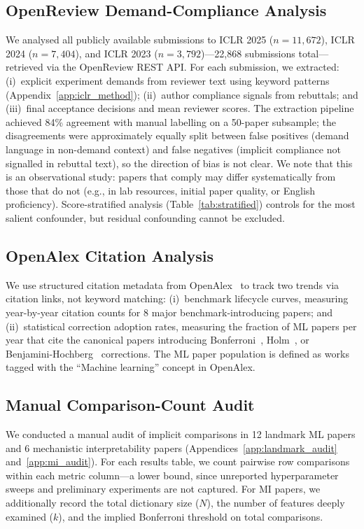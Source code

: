 \documentclass{article}
\begin{document}
\subsection{OpenReview Demand-Compliance Analysis}

We analysed all publicly available submissions to ICLR 2025 ($n = 11{,}672$), ICLR 2024 ($n = 7{,}404$), and ICLR 2023 ($n = 3{,}792$)---22,868 submissions total---retrieved via the OpenReview REST API. For each submission, we extracted: (i)~explicit experiment demands from reviewer text using keyword patterns (Appendix~\ref{app:iclr_method}); (ii)~author compliance signals from rebuttals; and (iii)~final acceptance decisions and mean reviewer scores. The extraction pipeline achieved 84\% agreement with manual labelling on a 50-paper subsample; the disagreements were approximately equally split between false positives (demand language in non-demand context) and false negatives (implicit compliance not signalled in rebuttal text), so the direction of bias is not clear. We note that this is an observational study: papers that comply may differ systematically from those that do not (e.g., in lab resources, initial paper quality, or English proficiency). Score-stratified analysis (Table~\ref{tab:stratified}) controls for the most salient confounder, but residual confounding cannot be excluded.

\subsection{OpenAlex Citation Analysis}

We use structured citation metadata from OpenAlex~\citep{priem_openalex_2022} to track two trends via citation links, not keyword matching: (i)~benchmark lifecycle curves, measuring year-by-year citation counts for 8 major benchmark-introducing papers; and (ii)~statistical correction adoption rates, measuring the fraction of ML papers per year that cite the canonical papers introducing Bonferroni~\citep{dunn_1961}, Holm~\citep{holm_1979}, or Benjamini-Hochberg~\citep{benjamini_hochberg_1995} corrections. The ML paper population is defined as works tagged with the ``Machine learning'' concept in OpenAlex.

\subsection{Manual Comparison-Count Audit}

We conducted a manual audit of implicit comparisons in 12 landmark ML papers and 6 mechanistic interpretability papers (Appendices~\ref{app:landmark_audit} and~\ref{app:mi_audit}). For each results table, we count pairwise row comparisons within each metric column---a lower bound, since unreported hyperparameter sweeps and preliminary experiments are not captured. For MI papers, we additionally record the total dictionary size ($N$), the number of features deeply examined ($k$), and the implied Bonferroni threshold on total comparisons.
\end{document}
